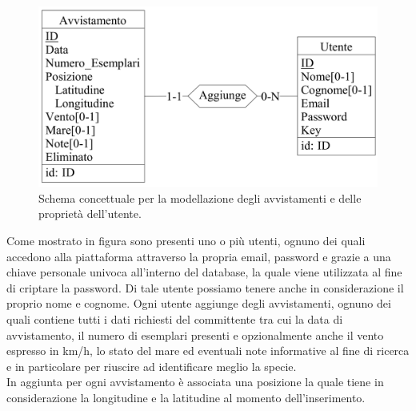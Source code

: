 \documentclass[a4paper,final,12pt]{report}
\begin{document}
\begin{figure}[hbtp]
\centering
\includegraphics[scale=0.15]{img_concettuale/avvistamento1.png}
\caption{Schema concettuale per la modellazione degli avvistamenti e delle proprietà dell'utente.}
\end{figure}

Come mostrato in figura sono presenti uno o più utenti, ognuno dei quali accedono alla piattaforma attraverso la propria email, password e grazie a una chiave personale univoca all'interno del database, la quale viene utilizzata al fine di criptare la password. Di tale utente possiamo tenere anche in considerazione il proprio nome e cognome.
Ogni utente aggiunge degli avvistamenti, ognuno dei quali contiene tutti i dati richiesti del committente tra cui la data di avvistamento, il numero di esemplari presenti e opzionalmente anche il vento espresso in km/h, lo stato del mare ed eventuali note informative al fine di ricerca e in particolare per riuscire ad identificare meglio la specie.\\
In aggiunta per ogni avvistamento è associata una posizione la quale tiene in considerazione la longitudine e la latitudine al momento dell'inserimento.
\end{document}
